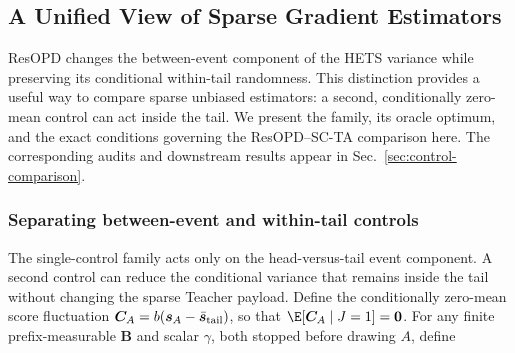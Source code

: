 \subsection{A Unified View of Sparse Gradient Estimators}
\label{sec:unified}

ResOPD changes the between-event component of the HETS variance while
preserving its conditional within-tail randomness. This distinction provides
a useful way to compare sparse unbiased estimators: a second,
conditionally zero-mean control can act inside the tail. We present the
family, its oracle optimum, and the exact conditions governing the
ResOPD--SC-TA comparison here. The corresponding audits and downstream
results appear in Sec.~\ref{sec:control-comparison}.

\subsubsection{Separating between-event and within-tail controls}
\label{sec:joint-family}
\label{sec:event-scta}

The single-control family acts only on the head-versus-tail event component. A
second control can reduce the conditional variance that remains inside the
tail without changing the sparse Teacher payload. Define the conditionally
zero-mean score fluctuation
$\bm{C}_A=b(\bm{s}_A-\bar{\bm{s}}_{\mathrm{tail}})$, so that
$\E[\bfluct_A\mid J=1]=\bm0$. For any finite prefix-measurable $\bm B$ and
scalar $\gamma$, both stopped before drawing $A$, define

